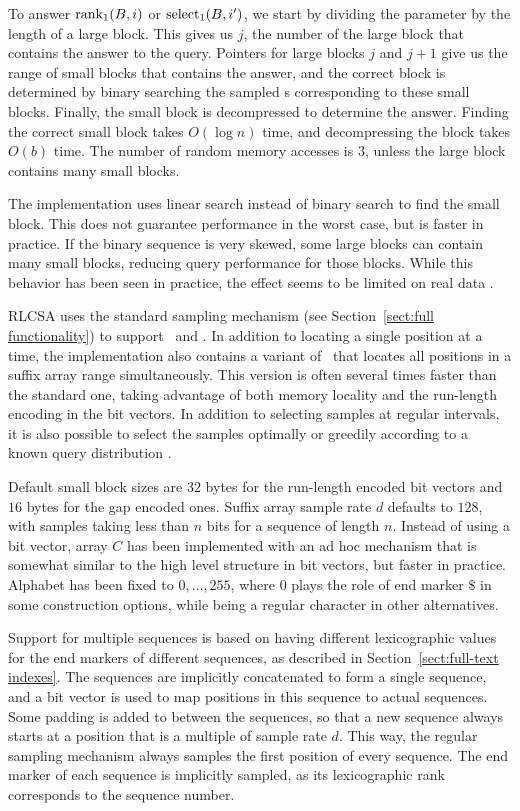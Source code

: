 To answer $\operatorname{rank}_{1}(B,i)$ or $\operatorname{select}_{1}(B,i')$, we start by dividing the parameter by the length of a large block. This gives us $j$, the number of the large block that contains the answer to the query. Pointers for large blocks $j$ and $j+1$ give us the range of small blocks that contains the answer, and the correct block is determined by binary searching the sampled \onebit{}s corresponding to these small blocks. Finally, the small block is decompressed to determine the answer. Finding the correct small block takes $O(\log n)$ time, and decompressing the block takes $O(b)$ time. The number of random memory accesses is $3$, unless the large block contains many small blocks.

The implementation uses linear search instead of binary search to find the small block. This does not guarantee performance in the worst case, but is faster in practice. If the binary sequence is very skewed, some large blocks can contain many small blocks, reducing query performance for those blocks. While this behavior has been seen in practice, the effect seems to be limited on real data \cite{Ferragina2011}.

RLCSA uses the standard sampling mechanism (see Section~\ref{sect:full functionality}) to support \locate\ and \extract. In addition to locating a single position at a time, the implementation also contains a variant of \locate\ that locates all positions in a suffix array range simultaneously. This version is often several times faster than the standard one, taking advantage of both memory locality and the run-length encoding in the bit vectors. In addition to selecting samples at regular intervals, it is also possible to select the samples optimally or greedily according to a known query distribution \cite{Ferragina2011}.

Default small block sizes are $32$ bytes for the run-length encoded bit vectors and $16$ bytes for the gap encoded ones. Suffix array sample rate $d$ defaults to $128$, with samples taking less than $n$ bits for a sequence of length $n$. Instead of using a bit vector, array $C$ has been implemented with an ad hoc mechanism that is somewhat similar to the high level structure in bit vectors, but faster in practice. Alphabet has been fixed to $0, \dotsc, 255$, where $0$ plays the role of end marker $\$$ in some construction options, while being a regular character in other alternatives.

Support for multiple sequences is based on having different lexicographic values for the end markers of different sequences, as described in Section~\ref{sect:full-text indexes}. The sequences are implicitly concatenated to form a single sequence, and a bit vector is used to map positions in this sequence to actual sequences. Some padding is added to between the sequences, so that a new sequence always starts at a position that is a multiple of sample rate $d$. This way, the regular sampling mechanism always samples the first position of every sequence. The end marker of each sequence is implicitly sampled, as its lexicographic rank corresponds to the sequence number.
\newpage


